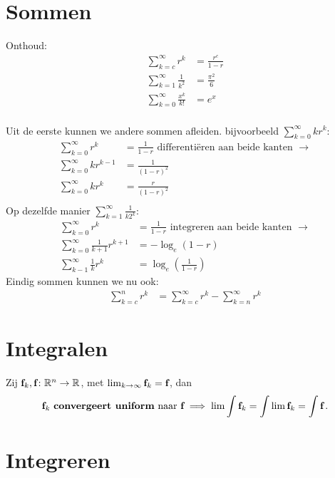 \documentclass{article}
\begin{document}
	\tableofcontents
	\section{Sommen}
 		Onthoud:
 		\begin{align*}
 			\sum_{k=c}^{\infty} r^k &= \frac{r^c}{1-r} \\
 			\sum_{k=1}^{\infty} \frac{1}{k^2} &= \frac{\pi^2}{6} \\
 			\sum_{k=0}^\infty \frac{x^k}{k!} &= e^x \\
 		\end{align*}
 		
 		Uit de eerste kunnen we andere sommen afleiden. bijvoorbeeld 
 		$\displaystyle \sum_{k=0}^{\infty} kr^k: $
 		\begin{align*}
 				\sum_{k=0}^{\infty} r^k &= \frac{1}{1-r} \text { differenti\"eren aan beide kanten } \to \\
 				\sum_{k=0}^{\infty} kr^{k-1} &= \frac{1}{(1-r)^2} \\
 				\sum_{k=0}^{\infty} kr^k &= \frac{r}{(1-r)^2} \\
 		\end{align*}
 		Op dezelfde manier $\displaystyle \sum_{k=1}^{\infty} \frac{1}{k2^k}$:
 		\begin{align*}
 				\sum_{k=0}^{\infty} r^k &= \frac{1}{1-r} \text { integreren aan beide kanten } \to \\
 				\sum_{k=0}^{\infty} \frac{1}{k+1} r^{k+1} &= -\log_e (1-r) \\
 				\sum_{k-1}^\infty \frac{1}{k} r^k &= \log_e (\frac{1}{1-r})
 		\end{align*}
 		Eindig sommen kunnen we nu ook:
 		\begin{align*}
 			\sum_{k=c}^n r^k &= \sum_{k=c}^\infty r^k - \sum_{k=n}^\infty r^k
 		\end{align*}
 		
 	\section{Integralen}
	 	\begin{stelling}
		 	Zij ${\textbf{f}}_k,{\textbf{f}} \colon \mathbb{R}^n \to \mathbb{R}$, met $\lim_{k \to \infty} {\textbf{f}}_k = {\textbf{f}}$, dan
		 	\[ {\textbf{f}}_k \text { \textbf{convergeert uniform} naar } {\textbf{f}} \implies \lim \int {\textbf{f}}_k = \int \lim {\textbf{f}}_k = \int {\textbf{f}} \,. \]
	 	\end{stelling}
	 	
	\section{Integreren}
\end{document}
